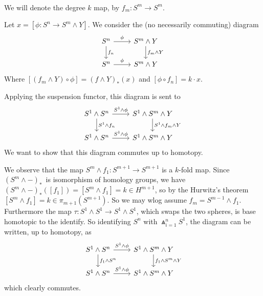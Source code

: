 

\mmaketitle

\begin{exercise}[1 \& 2]\ 

We will denote the degree $k$ map, by $f_m : S^m \to S^m$. 

Let $x = [\phi : S^n \to S^m \wedge Y]$. 
We consider the (no necessarily commuting) diagram 
\[ \begin{tikzcd}
S^n \arrow[r, "\phi"] \arrow[d, "f_n"]& S^m \wedge Y \arrow[d, "f_m \wedge Y"]
\\
S^n \arrow[r, "\phi"] & S^m \wedge Y
\end{tikzcd}  \]
Where $[ (f_m \wedge Y) \circ \phi ] = (f\wedge Y)_*(x)$ and $[ \phi \circ f_n ]
= k \cdot x$. 

Applying the suspension functor, this diagram is sent to 
\[ \begin{tikzcd}
S^1 \wedge S^n \arrow[r, "S^1 \wedge \phi"] \arrow[d, "S^1 \wedge f_n"]& S^1 \wedge S^m \wedge Y \arrow[d, "S^1 \wedge f_m \wedge Y"]
\\
S^1 \wedge S^n \arrow[r, "S^1 \wedge \phi"] & S^1 \wedge S^m \wedge Y
\end{tikzcd}  \]
We want to show that this diagram commutes up to homotopy.

We observe that the map $S^m \wedge f_1 : S^{m+1} \to S^{m+1}$ is a $k$-fold
map. Since $(S^m \wedge -)_*$ is isomorphism of homology groups, we have $(S^m
\wedge -)_*([f_1]) = [S^m \wedge f_1] = k \in H^{m+1}$, so by the Hurwitz's theorem $[S^m \wedge f_1] = k \in \pi_{m+1}(S^{m+1})$.
So we may wlog assume $f_m = S^{m-1} \wedge f_1$. 
Furthermore the map $\tau : S^1 \wedge S^1 \to S^1 \wedge S^1$, which swaps the two
spheres, is base homotopic to the identify. So identifying $S^n$ with
$\Wedge_{i=1}^n S^1$, the diagram can be written, up to homotopy, as 
\[ \begin{tikzcd}
S^1 \wedge S^n \arrow[r, "S^1 \wedge \phi"] \arrow[d, "f_1 \wedge S^n"]& S^1 \wedge S^m \wedge Y \arrow[d, " f_1 \wedge S^m \wedge Y"]
\\
S^1 \wedge S^n \arrow[r, "S^1 \wedge \phi"] & S^1 \wedge S^m \wedge Y
\end{tikzcd}  \]
which clearly commutes.


\end{exercise}
